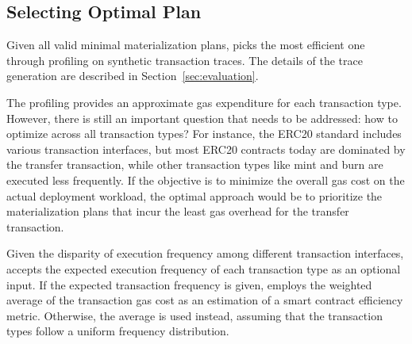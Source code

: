 \subsection{Selecting Optimal Plan}
\label{ssec:profile}

Given all valid minimal materialization plans, \proto picks the most efficient one through profiling on synthetic transaction traces. The details of the trace generation are described in Section~\ref{sec:evaluation}.

The profiling provides an approximate gas expenditure for each transaction type. However, there is still an important question that needs to be addressed: how to optimize across all transaction types? For instance, the ERC20 standard includes various transaction interfaces, but most ERC20 contracts today are dominated by the {\sf transfer} transaction, while other transaction types like {\sf mint} and {\sf burn} are executed less frequently. If the objective is to minimize the overall gas cost on the actual deployment workload, the optimal approach would be to prioritize the materialization plans that incur the least gas overhead for the {\sf transfer} transaction.

Given the disparity of execution frequency among different transaction interfaces, \proto accepts the expected execution frequency of each transaction type as an optional input. If the expected transaction frequency is given, \proto employs the weighted average of the transaction gas cost as an estimation of a smart contract efficiency metric. Otherwise, the average is used instead, assuming that the transaction types follow a uniform frequency distribution.

